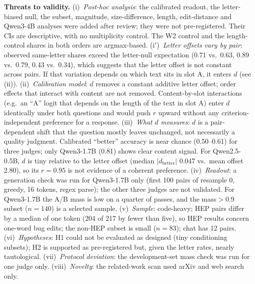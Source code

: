 \documentclass[conference]{IEEEtran}
\begin{document}
\textbf{Threats to validity.}
(i)~\emph{Post-hoc analysis}: the calibrated readout, the letter-biased null, the subset, magnitude,
size-difference, length, edit-distance and Qwen3-4B analyses were added after review; they were not pre-registered.
Their CIs are descriptive, with no multiplicity control. The W2 control and the length-control shares in both
orders are argmax-based.
(i$'$)~\emph{Letter offsets vary by pair}: observed same-letter shares exceed the letter-null expectation (0.71
vs.\ 0.63, 0.89 vs.\ 0.79, 0.43 vs.\ 0.34), which suggests that the letter offset is not constant across pairs.
If that variation depends on which text sits in slot A, it enters $d$ (see (ii)).
(ii)~\emph{Calibration model}: $d$ removes a constant additive letter offset; order effects that interact with
content are not removed. Content-by-slot interactions (e.g.\ an ``A'' logit that depends on the length of the text in
slot A) enter $d$ identically under both questions and would push $r$ upward without any criterion-independent
preference for a response.
(iii)~\emph{What $d$ measures}: $d$ is a pair-dependent shift that the question mostly leaves unchanged, not
necessarily a quality judgment. Calibrated ``better'' accuracy is near chance (0.50--0.61) for three judges; only
Qwen3-1.7B (0.81) shows clear content signal. For Qwen2.5-0.5B, $d$ is tiny relative to the letter offset (median
$|d_\mathrm{better}|$ 0.047 vs.\ mean offset 2.80), so its $r=0.95$ is not evidence of a coherent preference.
(iv)~\emph{Readout}: a generation check was run for Qwen3-1.7B only (first 100 pairs of resample 0, greedy, 16 tokens, regex parse); the other three judges are not validated. For Qwen3-1.7B the A/B mass is low on a quarter of
passes, and the mass$>$0.9 subset ($n=140$) is a selected sample.
(v)~\emph{Sample}: code-heavy; HEP pairs differ by a median of one token (204 of 217 by fewer than five), so HEP results concern one-word bug edits; the non-HEP subset is small ($n=83$); chat has 12
pairs.
(vi)~\emph{Hypotheses}: H1 could not be evaluated as designed (tiny conditioning subsets); H2 is supported as
pre-registered but, given the letter rates, nearly tautological.
(vii)~\emph{Protocol deviation}: the development-set mass check was run for one judge only.
(viii)~\emph{Novelty}: the related-work scan used arXiv and web search only.
\end{document}

